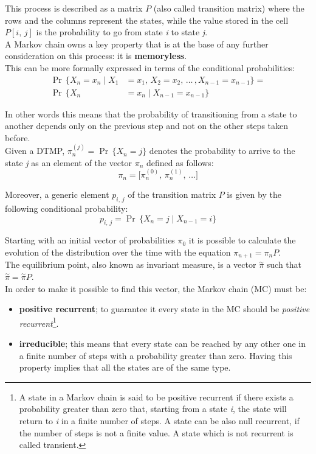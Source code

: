 This process is described as a matrix \( P \) (also called transition matrix) where the rows and the columns represent the states, while the value stored in the cell \( P[i,\,j] \) is the probability to go from state \emph{i} to state \emph{j}.\\
A Markov chain owns a key property that is at the base of any further consideration on this process: it is \textbf{memoryless}.\\
This can be more formally expressed in terms of the conditional probabilities:
\begin{equation} \tag{3} \label{memoryless}
\begin{split}
  \Pr\,\{X_{n} = x_{n} \mid X_{1} &= x_{1},\,X_{2} = x_{2},\,\dots\,, X_{n-1} = x_{n-1} \} =\\
  \Pr\,\{X_{n} &= x_{n} \mid X_{n-1} = x_{n-1}  \}
\end{split}
\end{equation}

In other words this means that the probability of transitioning from a state to another depends only on the previous step and not on the other steps taken before.\\
Given a DTMP, \( \pi_{n}^{(j)} = \Pr\,\{X_{n} = j\}\) denotes the probability to arrive to the state \emph{j} as an element of the vector \( \pi_{n} \) defined as follows:
\begin{equation*}
  \pi_{n} =  \big[\pi_{n}^{(0)},\,\pi_{n}^{(1)},\,\dots \big]
\end{equation*}

Moreover, a generic element \(p_{i,\,j}\) of the transition matrix \( P \) is given by the following conditional probability:
\begin{equation*}
  p_{i,\,j} = \Pr\,\{X_{n} = j \mid X_{n-1} = i\}
\end{equation*}

Starting with an initial vector of probabilities \( \pi_{0} \) it is possible to calculate the evolution of the distribution over the time with the equation \( \pi_{n+1} = \pi_{n}P \).\\
The equilibrium point, also known as invariant measure, is a vector \( \overset{\sim}{\pi} \) such that \( \overset{\sim}{\pi} = \overset{\sim}{\pi}P \).\\
In order to make it possible to find this vector, the Markov chain (MC) must be:
\begin{itemize}
  \item \textbf{positive recurrent}; to guarantee it every state in the MC should be \emph{positive recurrent}\footnote{A state in a Markov chain is said to be positive recurrent if there exists a probability greater than zero that, starting from a state \emph{i}, the state will return to \emph{i} in a finite number of steps. A state can be also null recurrent, if the number of steps is not a finite value. A state which is not recurrent is called transient.}. 
  \item \textbf{irreducible}; this means that every state can be reached by any other one in a finite number of steps with a probability greater than zero. Having this property implies that all the states are of the same type.  
\end{itemize}


